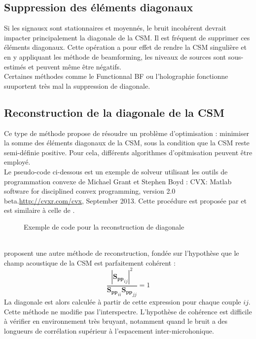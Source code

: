 \subsection{Suppression des éléments diagonaux}
Si les signausx sont stationnaires et moyennés, le bruit incohérent devrait impacter principalement la diagonale de la CSM. Il est fréquent de supprimer ces éléments diagonaux. Cette opération a pour effet de rendre la CSM singulière et en y appliquant les méthode de beamforming, les niveaux de sources sont sous-estimés et peuvent même être négatifs.\\
Certaines méthodes comme le Functionnal BF  ou l'holographie fonctionne suuportent très mal la suppression de diagonale.

\subsection{Reconstruction de la diagonale de la CSM}
Ce type de méthode propose de résoudre un problème d'optimisation : minimiser la somme des éléments diagonaux de la CSM, sous la condition que la CSM reste semi-définie positive. Pour cela, différents algorithmes d'opitmisation peuvent être employé.\\
Le pseudo-code ci-dessous est un exemple de solveur utilisant les outils de programmation convexe de Michael Grant et Stephen Boyd : CVX: Matlab software for disciplined convex programming, version 2.0 beta.\url{http://cvxr.com/cvx}, September 2013. Cette procédure est proposée par \cite{Hald2016} et est similaire à celle de \cite{dougherty2016}.

\begin{figure}[!h]
	\centering
	\caption{Exemple de code pour la reconstruction de diagonale}
\end{figure}

~\\
\cite{finez:hal-01276687} proposent une autre méthode de reconstruction, fondée sur l'hypothèse que le champ acoustique de la CSM est parfaitement cohérent : 
\begin{equation}
\frac{|{\bm{S_{pp}}}_{ij}|^2}{{\bm{S_{pp}}}_{ii}{\bm{S_{pp}}}_{jj}} =1
\end{equation}
La diagonale est alors calculée à partir de cette expression pour chaque couple $ij$. Cette méthode ne modifie pas l'interspectre. L'hypothèse de cohérence est difficile à vérifier en environnement très bruyant, notamment quand le bruit a des longueurs de corrélation supérieur à l'espacement inter-microhonique.\\


